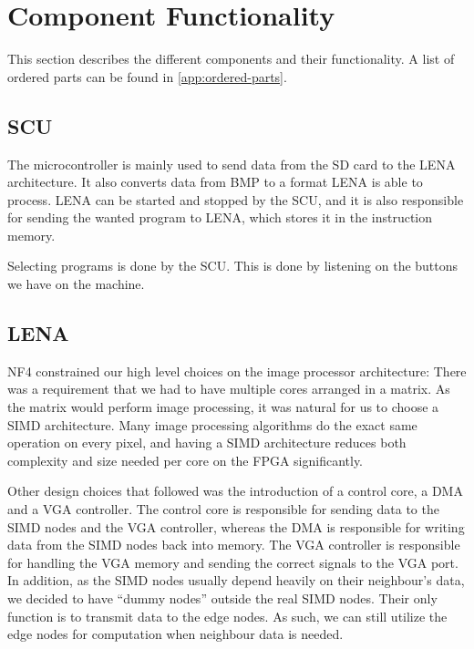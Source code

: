 \section{Component Functionality}

This section describes the different components and their functionality. A list
of ordered parts can be found in \ref{app:ordered-parts}.
\subsection{SCU}

The microcontroller is mainly used to send data from the \ac{SD} card to the
\ac{LENA} architecture. It also converts data from \ac{BMP} to a format
\ac{LENA} is able to process.  \ac{LENA} can be started and stopped by the \ac{SCU}, and
it is also responsible for sending the wanted program to \ac{LENA}, which stores
it in the instruction memory.

Selecting programs is done by the \ac{SCU}. This is done by listening on the
buttons we have on the machine.

\subsection{LENA}

NF4 constrained our high level choices on the image processor architecture:
There was a requirement that we had to have multiple cores arranged in a
matrix. As the matrix would perform image processing, it was natural for us to
choose a \ac{SIMD} architecture. Many image processing algorithms do the exact
same operation on every pixel, and having a \ac{SIMD} architecture reduces both
complexity and size needed per core on the \ac{FPGA} significantly.

Other design choices that followed was the introduction of a control core, a
\ac{DMA} and a \ac{VGA} controller. The control core is responsible for sending
data to the \ac{SIMD} nodes and the \ac{VGA} controller, whereas the \ac{DMA} is
responsible for writing data from the \ac{SIMD} nodes back into memory. The
\ac{VGA} controller is responsible for handling the \ac{VGA} memory and sending
the correct signals to the \ac{VGA} port. In addition, as the \ac{SIMD} nodes
usually depend heavily on their neighbour's data, we decided to have ``dummy
nodes'' outside the real \ac{SIMD} nodes. Their only function is to transmit
data to the edge nodes. As such, we can still utilize the edge nodes for
computation when neighbour data is needed.

